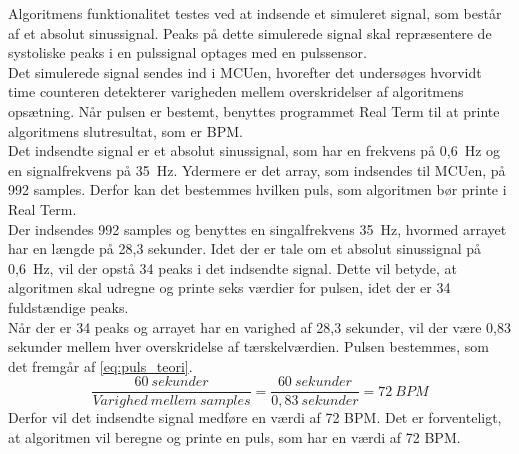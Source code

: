 Algoritmens funktionalitet testes ved at indsende et simuleret signal, som består af et absolut sinussignal. Peaks på dette simulerede signal skal repræsentere de systoliske peaks i en pulssignal optages med en pulssensor.\\
Det simulerede signal sendes ind i MCUen, hvorefter det undersøges hvorvidt time counteren detekterer varigheden mellem overskridelser af algoritmens opsætning. Når pulsen er bestemt, benyttes programmet Real Term til at printe algoritmens slutresultat, som er BPM. \\
Det indsendte signal er et absolut sinussignal, som har en frekvens på 0,6~Hz og en signalfrekvens på 35~Hz. Ydermere er det array, som indsendes til MCUen, på 992 samples. Derfor kan det bestemmes hvilken puls, som algoritmen bør printe i Real Term. \\
Der indsendes 992 samples og benyttes en singalfrekvens 35~Hz, hvormed arrayet har en længde på 28,3 sekunder. Idet der er tale om et absolut sinussignal på 0,6~Hz, vil der opstå 34 peaks i det indsendte signal. Dette vil betyde, at algoritmen skal udregne og printe seks værdier for pulsen, idet der er 34 fuldstændige peaks. \\
Når der er 34 peaks og arrayet har en varighed af 28,3 sekunder, vil der være 0,83 sekunder mellem hver overskridelse af tærskelværdien. Pulsen bestemmes, som det fremgår af \eqref{eq:puls_teori}.
\begin{equation}
\frac{60~sekunder}{Varighed~mellem~samples} = \frac{60~sekunder}{0,83~sekunder} = 72~BPM
\label{eq:puls_teori}
\end{equation} 
Derfor vil det indsendte signal medføre en værdi af 72 BPM. Det er forventeligt, at algoritmen vil beregne og printe en puls, som har en værdi af 72 BPM.

